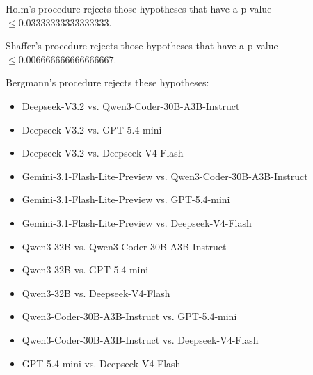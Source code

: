 \documentclass[a4paper,10pt]{article}
\begin{document}
\begin{landscape}
Holm's procedure rejects those hypotheses that have a p-value $\le0.03333333333333333$.


Shaffer's procedure rejects those hypotheses that have a p-value $\le0.006666666666666667$.


Bergmann's procedure rejects these hypotheses:


\begin{itemize}


\item Deepseek-V3.2 vs. Qwen3-Coder-30B-A3B-Instruct
\item Deepseek-V3.2 vs. GPT-5.4-mini
\item Deepseek-V3.2 vs. Deepseek-V4-Flash
\item Gemini-3.1-Flash-Lite-Preview vs. Qwen3-Coder-30B-A3B-Instruct
\item Gemini-3.1-Flash-Lite-Preview vs. GPT-5.4-mini
\item Gemini-3.1-Flash-Lite-Preview vs. Deepseek-V4-Flash
\item Qwen3-32B vs. Qwen3-Coder-30B-A3B-Instruct
\item Qwen3-32B vs. GPT-5.4-mini
\item Qwen3-32B vs. Deepseek-V4-Flash
\item Qwen3-Coder-30B-A3B-Instruct vs. GPT-5.4-mini
\item Qwen3-Coder-30B-A3B-Instruct vs. Deepseek-V4-Flash
\item GPT-5.4-mini vs. Deepseek-V4-Flash
\end{itemize}



\end{landscape}
\end{document}
